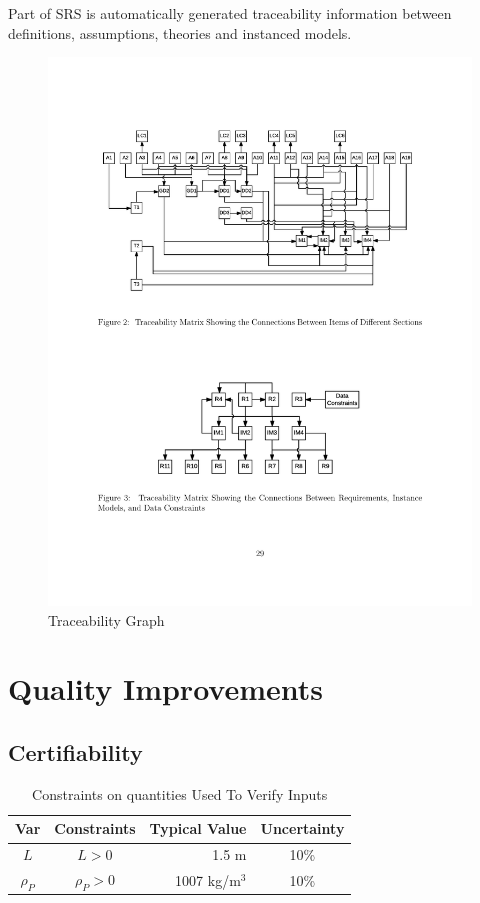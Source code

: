 \documentclass[sigconf]{acmart}
\begin{document}
Part of SRS is automatically generated traceability information between
definitions, assumptions, theories and instanced models.

\begin{figure}[htpb]
\begin{center}
\includegraphics[scale=0.45]{./figures/TraceGraph.pdf}
\end{center}
\caption{Traceability Graph}
\label{Fig_TraceGraph}
\end{figure}

\section{Quality Improvements} \label{SecQuality}

\subsection{Certifiability}

\begin{table} 
\centering
\caption{Constraints on quantities Used To Verify Inputs}
\begin{tabular}{c c r c } 
\toprule
\textbf{Var} & \textbf{Constraints} & \textbf{Typical Value} & \textbf{Uncertainty}\\ \midrule
$L$ & $L > 0$ & 1.5 m & 10\% \\ 
$\rho_P$ & $\rho_P > 0$	& 1007 kg/m$^3$	& 10\% \\
\bottomrule
\end{tabular}
\label{tab:pcm}
\end{table}
\end{document}
